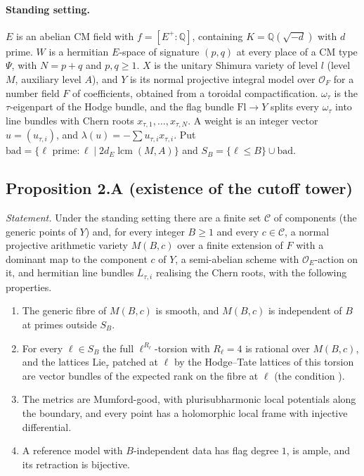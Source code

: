 \documentclass[11pt]{article}
\theoremstyle{remark}
\begin{document}
\paragraph{Standing setting.} $E$ is an abelian CM field with $f=[E^+:\mathbb Q]$, containing $K=\mathbb Q(\sqrt{-d})$ with $d$ prime. $W$ is a hermitian $E$-space of signature $(p,q)$ at every place of a CM type $\Psi$, with $N=p+q$ and $p,q\ge1$. $X$ is the unitary Shimura variety of level $l$ (level $M$, auxiliary level $A$), and $Y$ is its normal projective integral model over $\mathcal O_F$ for a number field $F$ of coefficients, obtained from a toroidal compactification. $\omega_\tau$ is the $\tau$-eigenpart of the Hodge bundle, and the flag bundle $\mathrm{Fl}\to Y$ splits every $\omega_\tau$ into line bundles with Chern roots $x_{\tau,1},\dots,x_{\tau,N}$. A weight is an integer vector $u=(u_{\tau,i})$, and $\lambda(u)=-\sum u_{\tau,i}x_{\tau,i}$. Put $\mathrm{bad}=\{\ell\text{ prime}:\ell\mid2d_E\operatorname{lcm}(M,A)\}$ and $S_B=\{\ell\le B\}\cup\mathrm{bad}$.

\subsection*{Proposition 2.A (existence of the cutoff tower)}

\emph{Statement.} Under the standing setting there are a finite set $\mathcal C$ of components (the generic points of $Y$) and, for every integer $B\ge1$ and every $c\in\mathcal C$, a normal projective arithmetic variety $M(B,c)$ over a finite extension of $F$ with a dominant map to the component $c$ of $Y$, a semi-abelian scheme with $\mathcal O_E$-action on it, and hermitian line bundles $\overline L_{\tau,i}$ realising the Chern roots, with the following properties.
\begin{enumerate}[label=(\roman*),nosep]
\item The generic fibre of $M(B,c)$ is smooth, and $M(B,c)$ is independent of $B$ at primes outside $S_B$.
\item For every $\ell\in S_B$ the full $\ell^{R_\ell}$-torsion with $R_\ell=4$ is rational over $M(B,c)$, and the lattices $\mathrm{Lie}_\tau$ patched at $\ell$ by the Hodge--Tate lattices of this torsion are vector bundles of the expected rank on the fibre at $\ell$ (the condition ).
\item The metrics are Mumford-good, with plurisubharmonic local potentials along the boundary, and every point has a holomorphic local frame with injective differential.
\item A reference model with $B$-independent data has flag degree $1$, is ample, and its retraction is bijective.
\end{enumerate}
\end{document}
